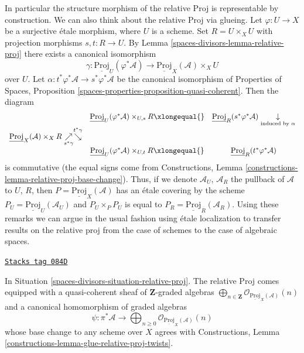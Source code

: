 In particular the structure morphism of the relative Proj is representable
by construction. We can also think about the relative Proj via glueing. Let
$\varphi : U \to X$ be a surjective \'etale morphism, where $U$ is a scheme.
Set $R = U \times_X U$ with projection morphisms $s, t : R  \to U$.
By Lemma \ref{spaces-divisors-lemma-relative-proj} there exists a canonical isomorphism
$$
\gamma :
\underline{\text{Proj}}_U(\varphi^*\mathcal{A})
\longrightarrow
\underline{\text{Proj}}_X(\mathcal{A}) \times_X U
$$
over $U$. Let $\alpha : t^*\varphi^*\mathcal{A} \to s^*\varphi^*\mathcal{A}$
be the canonical isomorphism of
Properties of Spaces, Proposition
\ref{spaces-properties-proposition-quasi-coherent}.
Then the diagram
$$
\begin{array}{ccc} & \underline{\text{Proj}}_U(\varphi^*\mathcal{A}) \times_{U, s} R
\xlongequal{} & \underline{\text{Proj}}_R(s^*\varphi^*\mathcal{A})
\underset{\text{induced by }\alpha}{\downarrow} \\ \underline{\text{Proj}}_X(\mathcal{A}) \times_X R
\underset{s^*\gamma}{\nearrow}\overset{t^*\gamma}{\searrow} &  &  \\  & \underline{\text{Proj}}_U(\varphi^*\mathcal{A}) \times_{U, t} R
\xlongequal{} & \underline{\text{Proj}}_R(t^*\varphi^*\mathcal{A})\end{array}
$$
is commutative (the equal signs come from
Constructions, Lemma \ref{constructions-lemma-relative-proj-base-change}).
Thus, if we denote $\mathcal{A}_U$, $\mathcal{A}_R$
the pullback of $\mathcal{A}$ to $U$, $R$, then
$P = \underline{\text{Proj}}_X(\mathcal{A})$ has an \'etale covering
by the scheme $P_U = \underline{\text{Proj}}_U(\mathcal{A}_U)$ and
$P_U \times_P P_U$ is equal to
$P_R = \underline{\text{Proj}}_R(\mathcal{A}_R)$.
Using these remarks we can argue in the usual fashion using \'etale
localization to transfer results on the relative proj from the case
of schemes to the case of algebraic spaces.

\begin{lemma}
\label{spaces-divisors-lemma-twists-of-structure-sheaf}
\href{https://stacks.math.columbia.edu/tag/084D}{\texttt{Stacks tag 084D}}

In Situation \ref{spaces-divisors-situation-relative-proj}. The relative Proj comes
equipped with a quasi-coherent sheaf of $\mathbf{Z}$-graded algebras
$\bigoplus_{n \in \mathbf{Z}}
\mathcal{O}_{\underline{\text{Proj}}_X(\mathcal{A})}(n)$
and a canonical homomorphism of graded algebras
$$
\psi :
\pi^*\mathcal{A}
\longrightarrow
\bigoplus\nolimits_{n \geq 0}
\mathcal{O}_{\underline{\text{Proj}}_X(\mathcal{A})}(n)
$$
whose base change to any scheme over $X$ agrees with
Constructions, Lemma \ref{constructions-lemma-glue-relative-proj-twists}.
\end{lemma}

